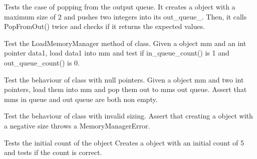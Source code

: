 \begin{DoxyRefList}
\item[Member \doxylink{memory__manager_8test_8cc_a9ef81e729010668e97ba03644b2c2424}{TEST} (Memory\+Manager\+Test, Pop\+From\+Out)]\label{test__test000005}%
%
Tests the case of popping from the output queue. It creates a  object with a maximum size of 2 and pushes two integers into its out\+\_\+queue\+\_\+. Then, it calls Pop\+From\+Out() twice and checks if it returns the expected values.  
\item[Member \doxylink{memory__manager_8test_8cc_aecbee3af655cacde7a60394e8f1e88be}{TEST} (Memory\+Manager\+Test, Load\+Memory\+Manager)]\label{test__test000006}%
%
Test the Load\+Memory\+Manager method of  class. Given a  object mm and an int pointer data1, load data1 into mm and test if in\+\_\+queue\+\_\+count() is 1 and out\+\_\+queue\+\_\+count() is 0.  
\item[Member \doxylink{memory__manager_8test_8cc_af5fbaada89aab5d80010625b03297b5b}{TEST} (Memory\+Manager\+Test, Null\+Ptr)]\label{test__test000007}%
%
Test the behaviour of  class with null pointers. Given a  object mm and two int pointers, load them into mm and pop them out to mm\textquotesingle{}s out queue. Assert that mm\textquotesingle{}s in queue and out queue are both non empty. 
\item[Member \doxylink{memory__manager_8test_8cc_a5f84596eef72e6d8af087735d225893c}{TEST} (Memory\+Manager\+Test, Bad\+Sizing)]\label{test__test000008}%
%
Test the behaviour of  class with invalid sizing. Assert that creating a  object with a negative size throws a Memory\+Manager\+Error.  
\item[Member \doxylink{semaphore_8test_8cc_af650c646e82923c918453607b393031e}{TEST} (Semaphore\+Test, Initial\+Count)]\label{test__test000009}%
%
Tests the initial count of the  object Creates a  object with an initial count of 5 and tests if the count is correct.  
\item[Member \doxylink{semaphore_8test_8cc_a45174a14d2cdeaa34e401178b0bd7f25}{TEST} (Semaphore\+Test, Wait\+Signal)]\label{test__test000010}%

\end{DoxyRefList}
